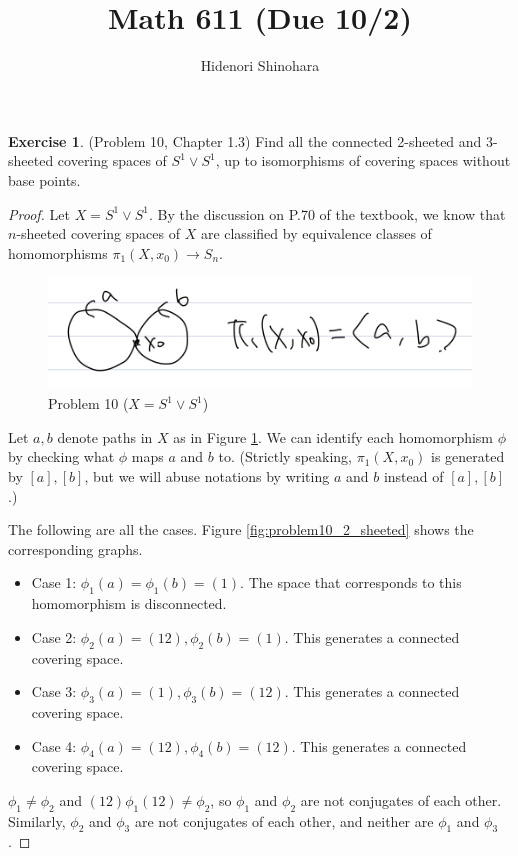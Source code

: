 \documentclass[12pt, psamsfonts]{amsart}
\theoremstyle{definition}
\newtheorem*{exer}{Exercise}
\theoremstyle{remark}
\numberwithin{equation}{section}
\begin{document}
\title{Math 611 (Due 10/2)}
\author{Hidenori Shinohara}
\maketitle

\begin{exer}{(Problem 10, Chapter 1.3)}
  Find all the connected 2-sheeted and 3-sheeted covering spaces of $S^1 \vee S^1$, up to isomorphisms of covering spaces without base points.
\end{exer}

\begin{proof}
  Let $X = S^1 \vee S^1$.
  By the discussion on P.70 of the textbook, we know that $n$-sheeted covering spaces of $X$ are classified by equivalence classes of homomorphisms $\pi_1(X, x_0) \rightarrow S_n$.
  \begin{figure}
    \includegraphics[width=.5\linewidth]{problem10_s1.jpeg}
    \caption{Problem 10 ($X = S^1 \vee S^1$)}
    \label{fig:problem10}
  \end{figure}
  Let $a, b$ denote paths in $X$ as in Figure \ref{fig:problem10}.
  We can identify each homomorphism $\phi$ by checking what $\phi$ maps $a$ and $b$ to.
  (Strictly speaking, $\pi_1(X, x_0)$ is generated by $[a], [b]$, but we will abuse notations by writing $a$ and $b$ instead of $[a], [b]$.)


  The following are all the cases.
  Figure \ref{fig:problem10_2_sheeted} shows the corresponding graphs.
  \begin{itemize}
    \item
      Case 1: $\phi_1(a) = \phi_1(b) = (1)$.
      The space that corresponds to this homomorphism is disconnected.
    \item
      Case 2: $\phi_2(a) = (12), \phi_2(b) = (1)$.
      This generates a connected covering space.
    \item
      Case 3: $\phi_3(a) = (1), \phi_3(b) = (12)$.
      This generates a connected covering space.
    \item
      Case 4: $\phi_4(a) = (12), \phi_4(b) = (12)$.
      This generates a connected covering space.
  \end{itemize}

  $\phi_1 \ne \phi_2$ and $(12)\phi_1(12) \ne \phi_2$, so $\phi_1$ and $\phi_2$ are not conjugates of each other.
  Similarly, $\phi_2$ and $\phi_3$ are not conjugates of each other, and neither are $\phi_1$ and $\phi_3$.


\end{proof}
\end{document}
